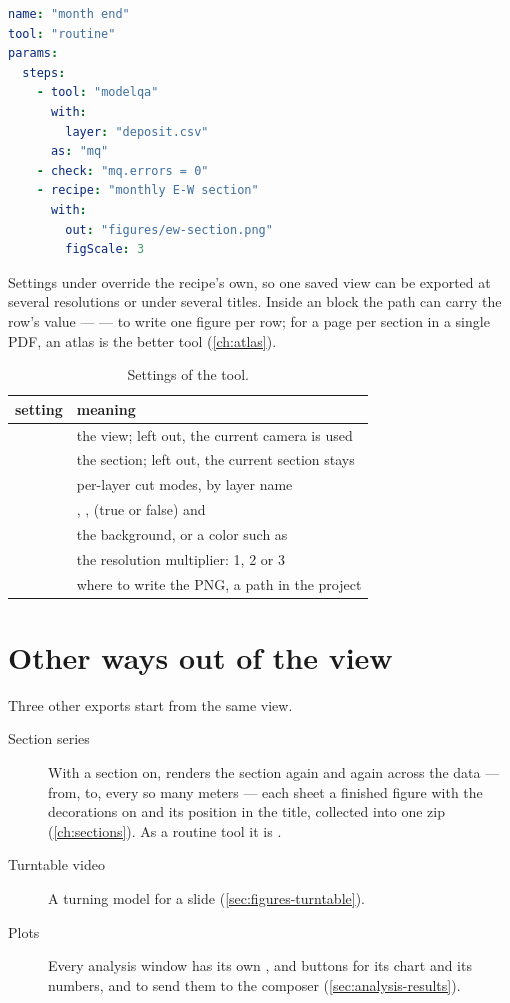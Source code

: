 \begin{lstlisting}[language=yaml]
name: "month end"
tool: "routine"
params:
  steps:
    - tool: "modelqa"
      with:
        layer: "deposit.csv"
      as: "mq"
    - check: "mq.errors = 0"
    - recipe: "monthly E-W section"
      with:
        out: "figures/ew-section.png"
        figScale: 3
\end{lstlisting}

Settings under  override the recipe's own, so one saved view can be exported at several resolutions or under several titles. Inside an  block the path can carry the row's value —  — to write one figure per row; for a page per section in a single PDF, an atlas is the better tool (\cref{ch:atlas}).

\begin{table}[htbp]\small
\begin{tabularx}{\linewidth}{@{}lL@{}}\toprule
setting & meaning \\ \midrule
{} & the view; left out, the current camera is used \\
 & the section; left out, the current section stays \\
 & per-layer cut modes, by layer name \\
 & , ,  (true or false) and  \\
 & the background,  or a color such as  \\
 & the resolution multiplier: 1, 2 or 3 \\
 & where to write the PNG, a path in the project \\ \bottomrule
\end{tabularx}
\caption{Settings of the  tool.}\label{tab:figures-tool}
\end{table}

\section{Other ways out of the view}\label{sec:figures-other}

Three other exports start from the same view.

\begin{description}
\item[Section series] With a section on,  renders the section again and again across the data — from, to, every so many meters — each sheet a finished figure with the decorations on and its position in the title, collected into one zip (\cref{ch:sections}). As a routine tool it is .
\item[Turntable video] A turning model for a slide (\cref{sec:figures-turntable}).
\item[Plots] Every analysis window has its own ,  and  buttons for its chart and its numbers, and  to send them to the composer (\cref{sec:analysis-results}).
\end{description}

